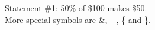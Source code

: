 \documentclass{article}
\begin{document}
Statement \#1:
50\% of \$100 makes \$50. \\
More special symbols are \&, \_, \{ and \}.
\end{document}
